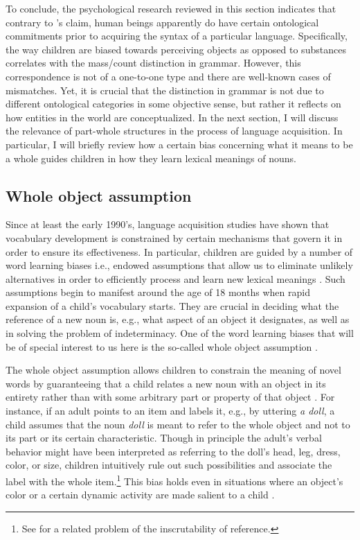 To conclude, the psychological research reviewed in this section indicates that contrary to \citeauthor{quine1960word}'s claim, human beings apparently do have certain ontological commitments prior to acquiring the syntax of a particular language. Specifically, the way children are biased towards perceiving objects as opposed to substances correlates with the mass/count distinction in grammar. However, this correspondence is not of a one-to-one  type and there are well-known cases of mismatches. Yet, it is crucial that the distinction in grammar is not due to different ontological categories in some objective sense, but rather it reflects on how entities in the world are conceptualized. In the next section, I will discuss the relevance of part-whole structures in the process of language acquisition. In particular, I will briefly review how a certain bias concerning what it means to be a whole guides children in how they learn lexical meanings of nouns. 

\subsection{Whole object assumption}\label{sec:whole-object-assumption}

Since at least the early 1990's, language acquisition studies have shown that vocabulary development is constrained by certain mechanisms that govern it in order to ensure its effectiveness. In particular, children are guided by a number of word learning biases i.e., endowed assumptions that allow us to eliminate unlikely alternatives in order to efficiently process and learn new lexical meanings \citep[see, e.g.,][]{markman1990constraints,hollich_golinkoff_hirsh-pasek2007young,hansen_markman2009children}. Such assumptions begin to manifest around the age of 18 months when rapid expansion of a child's vocabulary starts. They are crucial in deciding what the reference of a new noun is, e.g., what aspect of an object it designates, as well as in solving the problem of indeterminacy. One of the word learning biases that will be of special interest to us here is the so-called whole object assumption \citep{markman1990constraints}. 

The whole object assumption allows children to constrain the meaning of novel words by guaranteeing that a child relates a new noun with an object in its entirety rather than with some arbitrary part or property of that object \citep{markman1990constraints}. For instance, if an adult points to an item and labels it, e.g., by uttering \textit{a doll}, a child assumes that the noun \textit{doll} is meant to refer to the whole object and not to its part or its certain characteristic. Though in principle the adult's verbal behavior might have been interpreted as referring to the doll's head, leg, dress, color, or size, children intuitively rule out such possibilities and associate the label with the whole item.\footnote{See \citet{quine1960word} for a related problem of the inscrutability of reference.} This bias holds even in situations where an object's color or a certain dynamic activity are made salient to a child \citep{hansen_markman2009children}.

